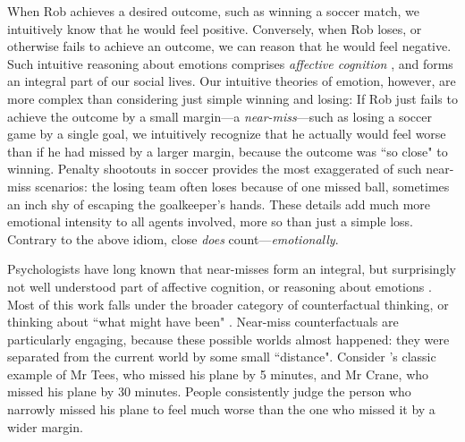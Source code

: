 \documentclass[10pt,letterpaper]{article}
\newcommand{\red}[1]{\textcolor{Red}{#1}}
\begin{document}
	When Rob achieves a desired outcome, such as winning a soccer match, we intuitively know that he would feel positive. Conversely, when Rob loses, or otherwise fails to achieve an outcome, we can reason that he would feel negative. Such intuitive reasoning about emotions comprises \textit{affective cognition} \cite{OngAffCog}, and forms an integral part of our social lives. Our intuitive theories of emotion, however, are more complex than considering just simple winning and losing: If Rob just fails to achieve the outcome by a small margin---a \textit{near-miss}---such as losing a soccer game by a single goal, we intuitively recognize that he actually would feel worse than if he had missed by a larger margin, because the outcome was ``so close" to winning. Penalty shootouts in soccer provides the most exaggerated of such near-miss scenarios: the losing team often loses because of one missed ball, sometimes an inch shy of escaping the goalkeeper's hands. These details add much more emotional intensity to all agents involved, more so than just a simple loss. Contrary to the above idiom, close \textit{does} count---\textit{emotionally}.
	
	Psychologists have long known that near-misses form an integral, but surprisingly not well understood part of affective cognition, or reasoning about emotions \cite{Johnson1986, Gleicher1990}. Most of this work falls under the broader category of counterfactual thinking, or thinking about ``what might have been" \cite{Bryne2002,McMullen2002, Medvec1997, Roese1997}. Near-miss counterfactuals are particularly engaging, because these possible worlds almost happened: they were separated from the current world by some small ``distance". Consider 's classic example of Mr Tees, who missed his plane by 5 minutes, and Mr Crane, who missed his plane by 30 minutes. People consistently judge the person who narrowly missed his plane to feel much worse than the one who missed it by a wider margin.
	
	
\end{document}
